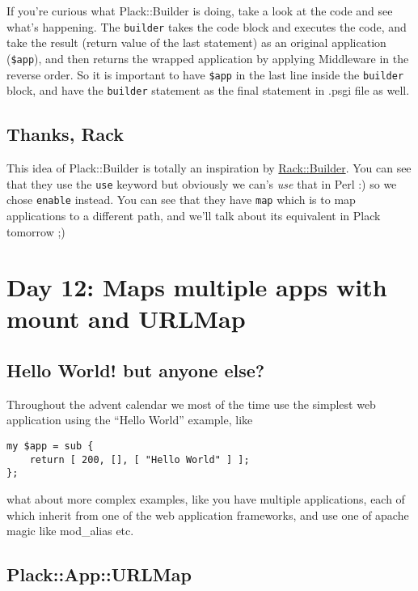 If you're curious what Plack::Builder is doing, take a look at the code
and see what's happening. The \lstinline!builder! takes the code block
and executes the code, and take the result (return value of the last
statement) as an original application (\lstinline!$app!), and then
returns the wrapped application by applying Middleware in the reverse
order. So it is important to have \lstinline!$app! in the last line
inside the \lstinline!builder! block, and have the \lstinline!builder!
statement as the final statement in .psgi file as well.

\subsection{Thanks, Rack}\label{thanks-rack}

This idea of Plack::Builder is totally an inspiration by
\href{http://m.onkey.org/2008/11/18/ruby-on-rack-2-rack-builder}{Rack::Builder}.
You can see that they use the \lstinline!use! keyword but obviously we
can's \emph{use} that in Perl :) so we chose \lstinline!enable! instead.
You can see that they have \lstinline!map! which is to map applications
to a different path, and we'll talk about its equivalent in Plack
tomorrow ;)

\section{Day 12: Maps multiple apps with mount and
URLMap}\label{day-12-maps-multiple-apps-with-mount-and-urlmap}

\subsection{Hello World! but anyone
else?}\label{hello-world-but-anyone-else}

Throughout the advent calendar we most of the time use the simplest web
application using the ``Hello World'' example, like

\begin{lstlisting}
my $app = sub {
    return [ 200, [], [ "Hello World" ] ];
};
\end{lstlisting}

what about more complex examples, like you have multiple applications,
each of which inherit from one of the web application frameworks, and
use one of apache magic like mod\_alias etc.

\subsection{Plack::App::URLMap}\label{plackappurlmap}

